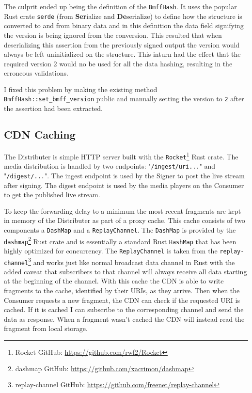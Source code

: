 The culprit ended up being the definition of the \texttt{BmffHash}. It uses the popular Rust crate \texttt{serde} (from \textbf{Ser}ialize and \textbf{De}serialize) to define how the structure is converted to and from binary data and in this definition the data field signifying the version is being ignored from the conversion. This resulted that when deserializing this assertion from the previously signed output the version would always be left uninitialized on the structure. This inturn had the effect that the required version 2 would no be used for all the data hashing, resulting in the erroneous validations.

I fixed this problem by making the existing method \texttt{BmffHash::set\_bmff\_version} public and manually setting the version to \texttt{2} after the assertion had been extracted.

\subsection{CDN Caching\label{sec:caching}}

The Distributer is simple HTTP server built with the \texttt{Rocket}\footnote{Rocket GitHub: \url{https://github.com/rwf2/Rocket}} Rust crate. The media distribution is handled by two endpoints: "\texttt{/ingest/uri...}" and "\texttt{/digest/...}". The ingest endpoint is used by the Signer to post the live stream after signing. The digest endpoint is used by the media players on the Consumer to get the published live stream.

To keep the forwarding delay to a minimum the most recent fragments are kept in memory of the Distributer as part of a proxy cache. This cache consists of two components a \texttt{DashMap} and a \texttt{ReplayChannel}. The \texttt{DashMap} is provided by the \texttt{dashmap}\footnote{dashmap GitHub: \url{https://github.com/xacrimon/dashmap}} Rust crate and is essentially a standard Rust \texttt{HashMap} that has been highly optimized for concurrency. The \texttt{ReplayChannel} is taken from the \texttt{replay-channel}\footnote{replay-channel GitHub: \url{https://github.com/freenet/replay-channel}} and works just like normal broadcast data channel in Rust with the added caveat that subscribers to that channel will always receive all data starting at the beginning of the channel. With this cache the CDN is able to write fragments to the cache, identified by their URIs, as they arrive. Then when the Consumer requests a new fragment, the CDN can check if the requested URI is cached. If it is cached I can subscribe to the corresponding channel and send the data as response. When a fragment wasn't cached the CDN will instead read the fragment from local storage.

